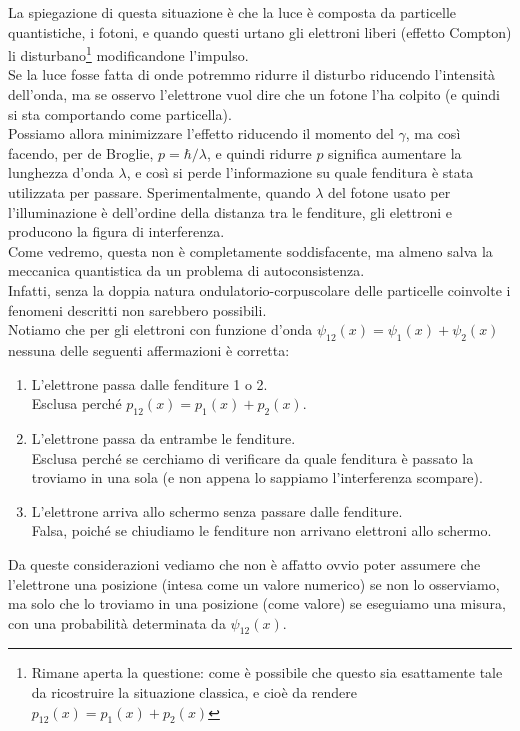 \documentclass[FisicaTeorica.tex]{subfiles}
\begin{document}
La spiegazione  di questa situazione è che la luce è composta da particelle quantistiche, i fotoni, e quando questi urtano gli elettroni liberi (effetto Compton) li disturbano\footnote{Rimane aperta la questione: come è possibile che questo  sia esattamente tale da ricostruire la situazione classica, e cioè da rendere $p_{12}(x) = p_1(x) + p_2(x)$} modificandone l'impulso.\\
Se la luce fosse fatta di onde potremmo ridurre il disturbo riducendo l'intensità dell'onda, ma se osservo l'elettrone vuol dire che un fotone l'ha colpito (e quindi si sta comportando come particella).\\
Possiamo allora minimizzare l'effetto riducendo il momento del $\gamma$, ma così facendo, per de Broglie, $p = \hbar / \lambda$, e quindi ridurre $p$ significa aumentare la lunghezza d'onda $\lambda$, e così si perde l'informazione su quale fenditura è stata utilizzata per passare. Sperimentalmente, quando $\lambda$ del fotone usato per l'illuminazione è dell'ordine della distanza tra le fenditure, gli elettroni  e producono la figura di interferenza.\\
Come vedremo, questa  non è completamente soddisfacente, ma almeno salva la meccanica quantistica da un problema di autoconsistenza.\\
Infatti, senza la doppia natura ondulatorio-corpuscolare delle particelle coinvolte i fenomeni descritti non sarebbero possibili.\\
Notiamo che per gli elettroni con funzione d'onda
$\psi_{12}(x) = \psi_1(x) + \psi_2(x)$
nessuna delle seguenti affermazioni è corretta:
\begin{enumerate}
    \item L'elettrone passa dalle fenditure 1 o 2.\\
    Esclusa perché $p_{12}(x) = p_1(x) + p_2(x)$.
    \item L'elettrone passa da entrambe le fenditure.\\
    Esclusa perché se cerchiamo di verificare da quale fenditura è passato la troviamo in una sola (e non appena lo sappiamo l'interferenza scompare).
    \item L'elettrone arriva allo schermo senza passare dalle fenditure.\\ Falsa, poiché se chiudiamo le fenditure non arrivano elettroni allo schermo.
\end{enumerate}
Da queste considerazioni vediamo che non è affatto ovvio poter assumere che l'elettrone  una posizione (intesa come un valore numerico) se non lo osserviamo, ma solo che lo troviamo in una posizione (come valore) se eseguiamo una misura, con una probabilità determinata da $\psi_{12}(x)$.
\end{document}

